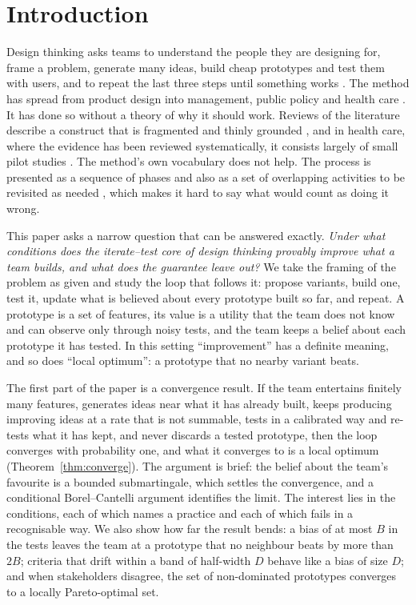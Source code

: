 \documentclass[10pt,twocolumn]{article}
\theoremstyle{definition}
\begin{document}
\section{Introduction}

Design thinking asks teams to understand the people they are designing for, frame a problem, generate many ideas, build cheap prototypes and test them with users, and to repeat the last three steps until something works \citep{brown2008, dschool2010}. The method has spread from product design into management, public policy and health care \citep{liedtka2015, mintrom2016, altman2018}. It has done so without a theory of why it should work. Reviews of the literature describe a construct that is fragmented and thinly grounded \citep{johansson2013, micheli2019}, and in health care, where the evidence has been reviewed systematically, it consists largely of small pilot studies \citep{altman2018}. The method's own vocabulary does not help. The process is presented as a sequence of phases and also as a set of overlapping activities to be revisited as needed \citep{brown2008}, which makes it hard to say what would count as doing it wrong.

This paper asks a narrow question that can be answered exactly. \emph{Under what conditions does the iterate--test core of design thinking provably improve what a team builds, and what does the guarantee leave out?} We take the framing of the problem as given and study the loop that follows it: propose variants, build one, test it, update what is believed about every prototype built so far, and repeat. A prototype is a set of features, its value is a utility that the team does not know and can observe only through noisy tests, and the team keeps a belief about each prototype it has tested. In this setting ``improvement'' has a definite meaning, and so does ``local optimum'': a prototype that no nearby variant beats.

The first part of the paper is a convergence result. If the team entertains finitely many features, generates ideas near what it has already built, keeps producing improving ideas at a rate that is not summable, tests in a calibrated way and re-tests what it has kept, and never discards a tested prototype, then the loop converges with probability one, and what it converges to is a local optimum (Theorem~\ref{thm:converge}). The argument is brief: the belief about the team's favourite is a bounded submartingale, which settles the convergence, and a conditional Borel--Cantelli argument identifies the limit. The interest lies in the conditions, each of which names a practice and each of which fails in a recognisable way. We also show how far the result bends: a bias of at most $B$ in the tests leaves the team at a prototype that no neighbour beats by more than $2B$; criteria that drift within a band of half-width $D$ behave like a bias of size $D$; and when stakeholders disagree, the set of non-dominated prototypes converges to a locally Pareto-optimal set.
\end{document}

